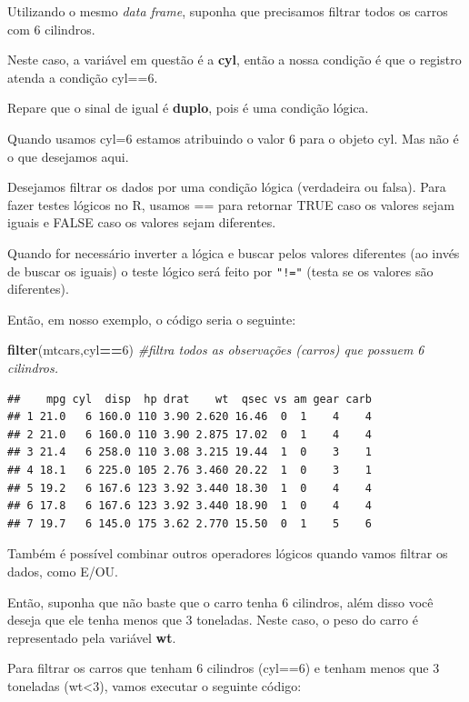 \documentclass[
]{book}
\newenvironment{Shaded}{\begin{snugshade}}{\end{snugshade}}
\newcommand{\CommentTok}[1]{\textcolor[rgb]{0.56,0.35,0.01}{\textit{#1}}}
\newcommand{\DecValTok}[1]{\textcolor[rgb]{0.00,0.00,0.81}{#1}}
\newcommand{\KeywordTok}[1]{\textcolor[rgb]{0.13,0.29,0.53}{\textbf{#1}}}
\newcommand{\NormalTok}[1]{#1}
\newcommand{\OperatorTok}[1]{\textcolor[rgb]{0.81,0.36,0.00}{\textbf{#1}}}
\begin{document}
Utilizando o mesmo \emph{data frame}, suponha que precisamos filtrar
todos os carros com 6 cilindros.

Neste caso, a variável em questão é a \textbf{cyl}, então a nossa
condição é que o registro atenda a condição cyl==6.

Repare que o sinal de igual é \textbf{duplo}, pois é uma condição
lógica.

Quando usamos cyl=6 estamos atribuindo o valor 6 para o objeto cyl. Mas
não é o que desejamos aqui.

Desejamos filtrar os dados por uma condição lógica (verdadeira ou
falsa). Para fazer testes lógicos no R, usamos == para retornar TRUE
caso os valores sejam iguais e FALSE caso os valores sejam diferentes.

Quando for necessário inverter a lógica e buscar pelos valores
diferentes (ao invés de buscar os iguais) o teste lógico será feito por
\texttt{"!="} (testa se os valores são diferentes).

Então, em nosso exemplo, o código seria o seguinte:

\begin{Shaded}
\begin{Highlighting}[]
\KeywordTok{filter}\NormalTok{(mtcars,cyl}\OperatorTok{==}\DecValTok{6}\NormalTok{)  }\CommentTok{#filtra todos as observações (carros) que possuem 6 cilindros. }
\end{Highlighting}
\end{Shaded}

\begin{verbatim}
##    mpg cyl  disp  hp drat    wt  qsec vs am gear carb
## 1 21.0   6 160.0 110 3.90 2.620 16.46  0  1    4    4
## 2 21.0   6 160.0 110 3.90 2.875 17.02  0  1    4    4
## 3 21.4   6 258.0 110 3.08 3.215 19.44  1  0    3    1
## 4 18.1   6 225.0 105 2.76 3.460 20.22  1  0    3    1
## 5 19.2   6 167.6 123 3.92 3.440 18.30  1  0    4    4
## 6 17.8   6 167.6 123 3.92 3.440 18.90  1  0    4    4
## 7 19.7   6 145.0 175 3.62 2.770 15.50  0  1    5    6
\end{verbatim}

Também é possível combinar outros operadores lógicos quando vamos
filtrar os dados, como E/OU.

Então, suponha que não baste que o carro tenha 6 cilindros, além disso
você deseja que ele tenha menos que 3 toneladas. Neste caso, o peso do
carro é representado pela variável \textbf{wt}.

Para filtrar os carros que tenham 6 cilindros (cyl==6) e tenham menos
que 3 toneladas (wt\textless3), vamos executar o seguinte código:
\end{document}

